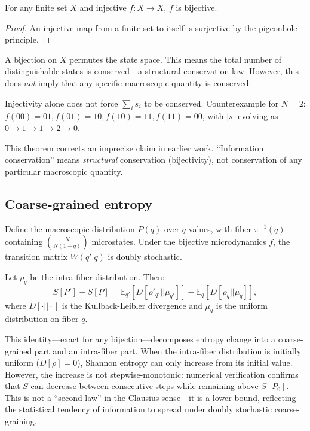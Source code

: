 \documentclass[reprint]{revtex4-2}
\begin{document}
\begin{theorem}[Bijectivity]
For any finite set $X$ and injective $f:X\to X$, $f$ is bijective.
\end{theorem}
\begin{proof}
An injective map from a finite set to itself is surjective by the pigeonhole principle.
\end{proof}

A bijection on $X$ permutes the state space. This means the total number of distinguishable states is conserved---a structural conservation law. However, this does \emph{not} imply that any specific macroscopic quantity is conserved:

\begin{theorem}
Injectivity alone does not force $\sum_i s_i$ to be conserved. Counterexample for $N=2$: $f(00)=01, f(01)=10, f(10)=11, f(11)=00$, with $|s|$ evolving as $0\to 1\to 1\to 2\to 0$.
\end{theorem}

This theorem corrects an imprecise claim in earlier work. ``Information conservation'' means \emph{structural} conservation (bijectivity), not conservation of any particular macroscopic quantity.

\subsection{Coarse-grained entropy}

Define the macroscopic distribution $P(q)$ over $q$-values, with fiber $\pi^{-1}(q)$ containing $\binom{N}{N(1-q)}$ microstates. Under the bijective microdynamics $f$, the transition matrix $W(q'|q)$ is doubly stochastic.

\begin{theorem}
\label{thm:entropy}
Let $\rho_q$ be the intra-fiber distribution. Then:
\begin{equation}
S[P'] - S[P] = \mathbb{E}_{q'}[D[\rho'_{q'}||\mu_{q'}]] - \mathbb{E}_q[D[\rho_q||\mu_q]],
\end{equation}
where $D[\cdot||\cdot]$ is the Kullback-Leibler divergence and $\mu_q$ is the uniform distribution on fiber $q$.
\end{theorem}

This identity---exact for any bijection---decomposes entropy change into a coarse-grained part and an intra-fiber part. When the intra-fiber distribution is initially uniform ($D[\rho]=0$), Shannon entropy can only increase from its initial value. However, the increase is not stepwise-monotonic: numerical verification confirms that $S$ can decrease between consecutive steps while remaining above $S[P_0]$. This is not a ``second law'' in the Clausius sense---it is a lower bound, reflecting the statistical tendency of information to spread under doubly stochastic coarse-graining.
\end{document}
